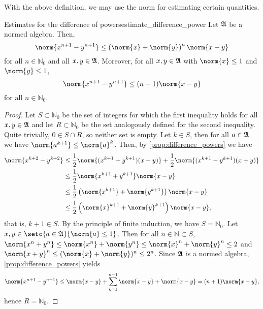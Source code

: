 With the above definition, we may use the norm for estimating certain quantities.
\begin{lemma}{Estimates for the difference of powers}{estimate_difference_power}
    Let \(\mathfrak{A}\) be a normed algebra. Then,
    \begin{equation*}
        \norm{x^{n+1} - y^{n+1}}\leq \left(\norm{x} + \norm{y}\right)^n \norm{x-y}
    \end{equation*}
    for all \(n \in \mathbb{N}_0\) and all \(x,y \in \mathfrak{A}\). Moreover, for all \(x, y \in \mathfrak{A}\) with \(\norm{x} \leq 1\) and \(\norm{y} \leq 1\),
    \begin{equation*}
        \norm{x^{n+1} - y^{n+1}} \leq (n+1)\norm{x-y}
    \end{equation*}
    for all \(n \in \mathbb{N}_0\).
\end{lemma}
\begin{proof}
    Let \(S\subset \mathbb{N}_0\) be the set of integers for which the first inequality holds for all \(x, y \in \mathfrak{A}\) and let \(R \subset \mathbb{N}_0\) be the set analogously defined for the second inequality. Quite trivially, \(0 \in S \cap R\), so neither set is empty. Let \(k \in S\), then for all \(a \in \mathfrak{A}\) we have \(\norm{a^{k+1}} \leq \norm{a}^k\). Then, by \cref{prop:difference_powers} we have
    \begin{align*}
        \norm{x^{k+2} - y^{k+2}} &\leq \frac12 \norm{(x^{k+1} + y^{k+1})(x - y)} + \frac12\norm{(x^{k+1} - y^{k+1})(x+y)}\\
                                 &\leq \frac12 \norm{x^{k+1} + y^{k+1}} \norm{x - y}\\
                                 &\leq \frac12\left(\norm{x^{k+1}} + \norm{y^{k+1}}\right)\norm{x - y}\\
                                 &\leq \frac12\left(\norm{x}^{k+1} + \norm{y}^{k+1}\right)\norm{x - y},
    \end{align*}
    that is, \(k + 1 \in S\). By the principle of finite induction, we have \(S = \mathbb{N}_0\). Let \(x, y \in \setc{a \in \algebra{A}}{\norm{a} \leq 1}\). Then for all \(n \in \mathbb{N} \subset S\), \(\norm{x^n + y^n} \leq \norm{x^n} + \norm{y^n} \leq \norm{x}^n + \norm{y}^n\leq 2\) and \(\norm{x + y}^n \leq (\norm{x} + \norm{y})^n \leq 2^n\). Since \(\mathfrak{A}\) is a normed algebra, \cref{prop:difference_powers} yields
    \begin{equation*}
        \norm{x^{n+1} - y^{n+1}} \leq \norm{x - y} + \sum_{k=1}^{n-1} \norm{x-y} + \norm{x-y} = (n+1)\norm{x-y},
    \end{equation*}
    hence \(R = \mathbb{N}_0\).
\end{proof}

